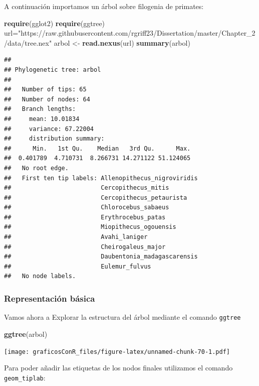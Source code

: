 \documentclass[]{article}
\newenvironment{Shaded}{\begin{snugshade}}{\end{snugshade}}
\newcommand{\KeywordTok}[1]{\textcolor[rgb]{0.13,0.29,0.53}{\textbf{#1}}}
\newcommand{\NormalTok}[1]{#1}
\newcommand{\StringTok}[1]{\textcolor[rgb]{0.31,0.60,0.02}{#1}}
\numberwithin{ejcnt}{section}
\begin{document}
A continuación importamos un árbol sobre filogenia de primates:

\begin{Shaded}
\begin{Highlighting}[]
\KeywordTok{require}\NormalTok{(gglot2)}
\KeywordTok{require}\NormalTok{(ggtree)}
\NormalTok{url=}\StringTok{"https://raw.githubusercontent.com/rgriff23/Dissertation/master/Chapter_2/data/tree.nex"}
\NormalTok{arbol <-}\StringTok{ }\KeywordTok{read.nexus}\NormalTok{(url)}
\KeywordTok{summary}\NormalTok{(arbol)}
\end{Highlighting}
\end{Shaded}

\begin{verbatim}
## 
## Phylogenetic tree: arbol 
## 
##   Number of tips: 65 
##   Number of nodes: 64 
##   Branch lengths:
##     mean: 10.01834 
##     variance: 67.22004 
##     distribution summary:
##      Min.   1st Qu.    Median   3rd Qu.      Max. 
##  0.401789  4.710731  8.266731 14.271122 51.124065 
##   No root edge.
##   First ten tip labels: Allenopithecus_nigroviridis 
##                         Cercopithecus_mitis
##                         Cercopithecus_petaurista
##                         Chlorocebus_sabaeus
##                         Erythrocebus_patas
##                         Miopithecus_ogouensis
##                         Avahi_laniger
##                         Cheirogaleus_major
##                         Daubentonia_madagascarensis
##                         Eulemur_fulvus
##   No node labels.
\end{verbatim}

\hypertarget{representacion-basica}{%
\subsubsection{Representación básica}\label{representacion-basica}}

Vamos ahora a Explorar la estructura del árbol mediante el comando \texttt{ggtree}

\begin{Shaded}
\begin{Highlighting}[]
\KeywordTok{ggtree}\NormalTok{(arbol)}
\end{Highlighting}
\end{Shaded}

\texttt{[image: graficosConR\_files/figure-latex/unnamed-chunk-70-1.pdf]}

Para poder añadir las etiquetas de los nodos finales utilizamos el comando \texttt{geom\_tiplab}:
\end{document}
